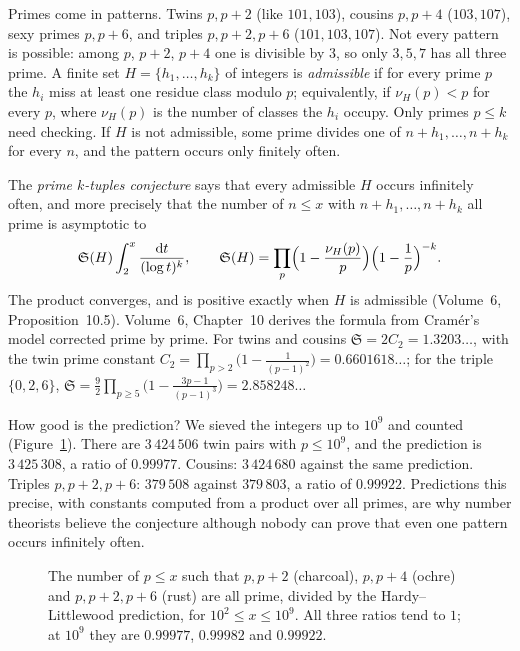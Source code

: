 Primes come in patterns. Twins $p,p+2$ (like $101,103$), cousins $p,p+4$ ($103,107$), sexy primes $p,p+6$, and triples $p,p+2,p+6$ ($101,103,107$).
Not every pattern is possible: among $p$, $p+2$, $p+4$ one is divisible by $3$, so only $3,5,7$ has all three prime. A finite set
$H=\{h_1,\dots,h_k\}$ of integers is \emph{admissible} if for every prime $p$ the $h_i$ miss at least one residue class modulo $p$; equivalently,
if $\nu_H(p)<p$ for every $p$, where $\nu_H(p)$ is the number of classes the $h_i$ occupy. Only primes $p\le k$ need checking. If $H$ is not
admissible, some prime divides one of $n+h_1,\dots,n+h_k$ for every $n$, and the pattern occurs only finitely often.

\begin{remark}
The \emph{prime $k$-tuples conjecture} says that every admissible $H$ occurs infinitely often, and more precisely that the number of $n\le x$ with
$n+h_1,\dots,n+h_k$ all prime is asymptotic to
\[
\mathfrak S(H)\int_2^x\frac{\mathrm dt}{(\log t)^k},\qquad\mathfrak S(H)=\prod_p\Bigl(1-\frac{\nu_H(p)}p\Bigr)\Bigl(1-\frac1p\Bigr)^{-k}.
\]
The product converges, and is positive exactly when $H$ is admissible (Volume~6, Proposition~10.5). Volume~6, Chapter~10 derives the formula from
Cram\'er's model corrected prime by prime. For twins and cousins $\mathfrak S=2C_2=1.3203\ldots$, with the twin prime constant
$C_2=\prod_{p>2}\bigl(1-\frac1{(p-1)^2}\bigr)=0.6601618\ldots$; for the triple $\{0,2,6\}$, $\mathfrak S=\frac92\prod_{p\ge5}\bigl(1-\frac{3p-1}{(p-1)^3}\bigr)=2.858248\ldots$
\end{remark}

How good is the prediction? We sieved the integers up to $10^9$ and counted (Figure~\ref{conjectures:fig:tuples}). There are $3\,424\,506$ twin pairs with
$p\le10^9$, and the prediction is $3\,425\,308$, a ratio of $0.99977$. Cousins: $3\,424\,680$ against the same prediction. Triples $p,p+2,p+6$: $379\,508$ against
$379\,803$, a ratio of $0.99922$. Predictions this precise, with constants computed from a product over all primes, are why number theorists believe
the conjecture although nobody can prove that even one pattern occurs infinitely often.

\begin{figure}[ht]
\centering
{}
\caption{The number of $p\le x$ such that $p,p+2$ (charcoal), $p,p+4$ (ochre) and $p,p+2,p+6$ (rust) are all prime, divided by the Hardy--Littlewood
prediction, for $10^2\le x\le10^9$. All three ratios tend to $1$; at $10^9$ they are $0.99977$, $0.99982$ and $0.99922$.}
\label{conjectures:fig:tuples}
\end{figure}

